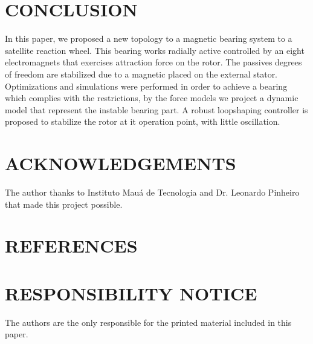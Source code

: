 \documentclass[10pt,fleqn,a4paper,twoside]{article}
\begin{document}
	\section{CONCLUSION}
	
	In this paper, we proposed a new topology to a magnetic bearing system to a satellite reaction wheel. This bearing works radially active controlled by an eight electromagnets that exercises attraction force on the rotor. The passives degrees of freedom are stabilized due to a magnetic placed on the external stator. Optimizations and simulations were performed in order to achieve a bearing which complies with the restrictions, by the force models we project a dynamic model that represent the instable bearing part. A robust loopshaping controller is proposed to stabilize the rotor at it operation point, with little oscillation.
		
	\section{ACKNOWLEDGEMENTS}
	
	The author thanks to Instituto Mau\'{a} de Tecnologia and Dr. Leonardo Pinheiro that made this project possible.
	
	\section{REFERENCES} 
	
	
	\renewcommand{\refname}{}
	
	
	\section{RESPONSIBILITY NOTICE}
	
	The authors are the only responsible for the printed material included in this paper.
	
\end{document}
